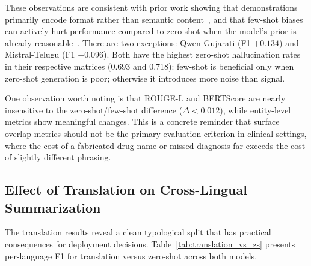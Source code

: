 \documentclass[conference]{IEEEtran}
\begin{document}
These observations are consistent with prior work showing that
demonstrations primarily encode format rather than semantic
content~\cite{min2022rethinking}, and that few-shot biases can actively
hurt performance compared to zero-shot when the model's prior is already
reasonable~\cite{zhao2021calibrate}. There are two exceptions:
Qwen-Gujarati (F1 $+0.134$) and Mistral-Telugu (F1 $+0.096$). Both have
the highest zero-shot hallucination rates in their respective matrices
(0.693 and 0.718): few-shot is beneficial only when zero-shot generation
is poor; otherwise it introduces more noise than signal.

One observation worth noting is that ROUGE-L and BERTScore are nearly
insensitive to the zero-shot/few-shot difference ($\Delta < 0.012$), while
entity-level metrics show meaningful changes. This is a concrete reminder
that surface overlap metrics should not be the primary evaluation criterion
in clinical settings, where the cost of a fabricated drug name or missed
diagnosis far exceeds the cost of slightly different phrasing.

\subsection{Effect of Translation on Cross-Lingual Summarization}

The translation results reveal a clean typological split that has practical
consequences for deployment decisions. Table~\ref{tab:translation_vs_zs}
presents per-language F1 for translation versus zero-shot across both models.
\end{document}
